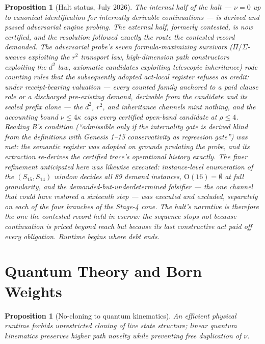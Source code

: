 \documentclass[11pt]{article}
\theoremstyle{plain}
\newtheorem{proposition}[theorem]{Proposition}
\theoremstyle{definition}
\theoremstyle{remark}
\begin{document}
\begin{proposition}[Halt status, July 2026]
The internal half of the halt --- \(\nu=0\) up to canonical identification for internally derivable continuations --- is derived and passed adversarial engine probing. The external half, formerly contested, is now certified, and the resolution followed exactly the route the contested record demanded. The adversarial probe's seven formula-maximizing survivors (\(\Pi/\Sigma\)-weaves exploiting the \(r^2\) transport law, high-dimension path constructors exploiting the \(d^2\) law, axiomatic candidates exploiting telescopic inheritance) rode counting rules that the subsequently adopted act-local register refuses as credit: under receipt-bearing valuation --- every counted family anchored to a paid clause role or a discharged pre-existing demand, derivable from the candidate and its sealed prefix alone --- the \(d^2\), \(r^2\), and inheritance channels mint nothing, and the accounting bound \(\nu\le4\kappa\) caps every certified open-band candidate at \(\rho\le4\). Reading B's condition (``admissible only if the internality gate is derived blind from the definitions with Genesis 1--15 conservativity as regression gate'') was met: the semantic register was adopted on grounds predating the probe, and its extraction re-derives the certified trace's operational history exactly. The finer refinement anticipated here was likewise executed: instance-level enumeration of the \((S_{15},S_{14})\) window decides all 89 demand instances, \(\mathrm{O}(16)=\emptyset\) at full granularity, and the demanded-but-underdetermined falsifier --- the one channel that could have restored a sixteenth step --- was executed and excluded, separately on each of the four branches of the Stage-4 cone. The halt's narrative is therefore the one the contested record held in escrow: the sequence stops not because continuation is priced beyond reach but because its last constructive act paid off every obligation. Runtime begins where debt ends.
\end{proposition}

\section{Quantum Theory and Born Weights}

\begin{proposition}[No-cloning to quantum kinematics]
An efficient physical runtime forbids unrestricted cloning of live state structure; linear quantum kinematics preserves higher path novelty while preventing free duplication of \(\nu\).
\end{proposition}
\end{document}
